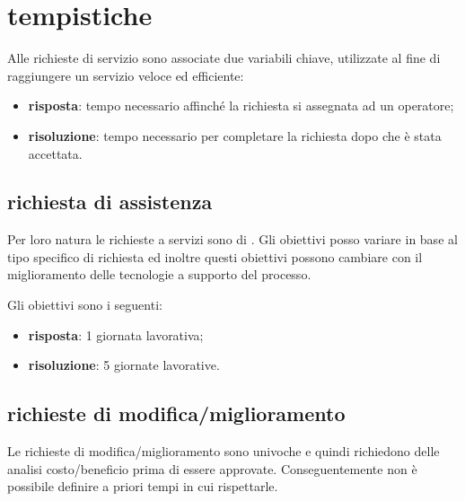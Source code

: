 %
%
\section[Tempistiche]{tempistiche}
\label{rf-target}
Alle richieste di servizio sono associate due variabili chiave, utilizzate al fine di raggiungere un servizio veloce ed efficiente:

\begin{itemize}
\item{\textbf{risposta}: tempo necessario affinché la richiesta si assegnata ad un operatore;}
\item{\textbf{risoluzione}: tempo necessario per completare la richiesta dopo che è stata accettata.}
\end{itemize}

\subsection[Richieste di assistenza]{richiesta di assistenza}
\label{rf-target-asr}
Per loro natura le richieste a servizi  sono di . Gli obiettivi posso variare in base al tipo specifico di richiesta ed inoltre questi obiettivi possono cambiare con il miglioramento delle tecnologie a supporto del processo.

Gli obiettivi sono i seguenti:

\begin{itemize}
\item{\textbf{risposta}: 1 giornata lavorativa;}
\item{\textbf{risoluzione}: 5 giornate lavorative.}
\end{itemize}

\subsection[Richieste di modifica/miglioramento]{richieste di modifica/miglioramento}
\label{rf-target-ecr}
Le richieste di modifica/miglioramento sono univoche e quindi richiedono delle analisi costo/beneficio prima di essere approvate. Conseguentemente non è possibile definire a priori tempi in cui rispettarle.